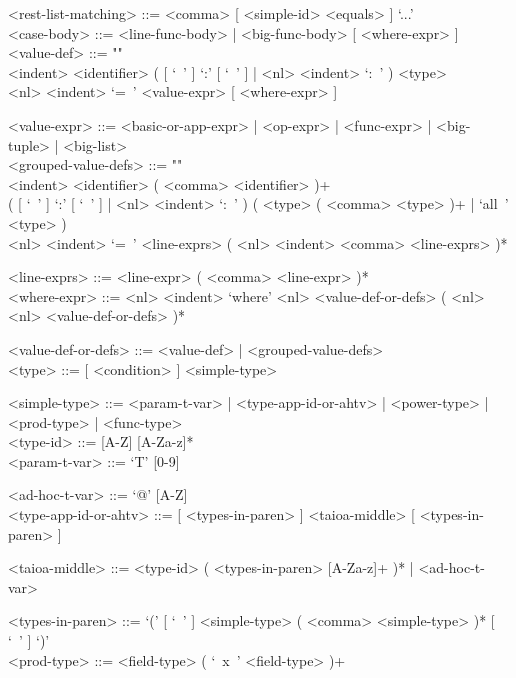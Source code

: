 \documentclass{article}
\begin{document}
\begin{grammar}
<rest-list-matching> ::= <comma> [ <simple-id> <equals> ] `...'
\\

<case-body> ::= <line-func-body> | <big-func-body> [ <where-expr> ]
\\

<value-def> ::= ""\\
<indent> <identifier>
( [ `\ ' ] `:' [ `\ ' ] | <nl> <indent> `:\ ' ) <type>  \\
<nl> <indent> `=\ ' <value-expr> [ <where-expr> ]

<value-expr> ::=
<basic-or-app-expr> | <op-expr> | <func-expr> | <big-tuple> | <big-list>
\\

<grouped-value-defs> ::= ""\\
<indent> <identifier> ( <comma> <identifier> )+ \\
( [ `\ ' ] `:' [ `\ ' ] | <nl> <indent> `:\ ' )
( <type> ( <comma> <type> )+ | `all\ ' <type> ) \\
<nl> <indent> `=\ ' <line-exprs> ( <nl> <indent> <comma> <line-exprs> )*

<line-exprs> ::= <line-expr> ( <comma> <line-expr> )*
\\

<where-expr> ::=
<nl> <indent> `where'
<nl> <value-def-or-defs> ( <nl> <nl> <value-def-or-defs> )*

<value-def-or-defs> ::= <value-def> | <grouped-value-defs>
\\

<type> ::= [ <condition> ]  <simple-type>

<simple-type> ::=
<param-t-var> | <type-app-id-or-ahtv> | <power-type> | <prod-type> |
<func-type>
\\

<type-id> ::= [A-Z] [A-Za-z]*
\\

<param-t-var> ::= `T' [0-9]

<ad-hoc-t-var> ::= `@' [A-Z]
\\

<type-app-id-or-ahtv> ::=
[ <types-in-paren> ] <taioa-middle> [ <types-in-paren> ]

<taioa-middle> ::=
<type-id> ( <types-in-paren> [A-Za-z]+ )* | <ad-hoc-t-var>

<types-in-paren> ::=
`(' [ `\ ' ] <simple-type> ( <comma> <simple-type> )* [ `\ ' ] `)'
\\

<prod-type> ::= <field-type> ( `\ x\ ' <field-type> )+


\end{grammar}
\end{document}
